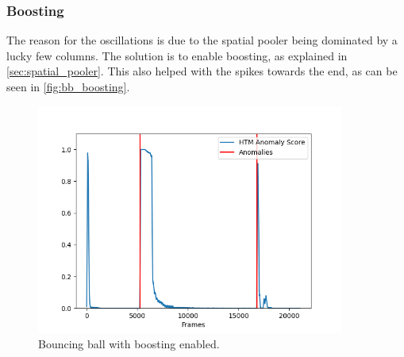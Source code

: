 \subsubsection{Boosting}
The reason for the oscillations is due to the spatial pooler being dominated by a lucky few columns. The solution is to enable boosting, as explained in \autoref{sec:spatial_pooler}. This also helped with the spikes towards the end, as can be seen in \autoref{fig:bb_boosting}.\par
\begin{figure}[H]
    \centering
    \includegraphics[width=0.9\textwidth]{resources/experiments/bouncing_ball/bb_anoms_boosting.png}
    \caption{Bouncing ball with boosting enabled.}
    \label{fig:bb_boosting}
\end{figure}
